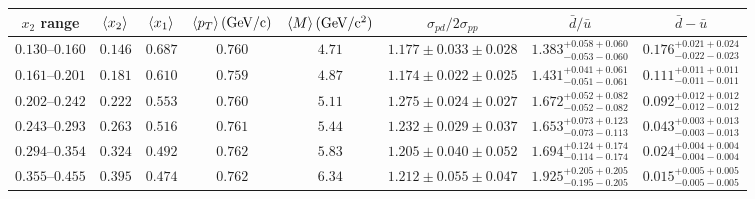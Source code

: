 {
\renewcommand{\arraystretch}{1.5}
\begin{tabular}{cccccccc}
	\hline\hline
	$x_{2}$ range    & $\expval{x_{2}}$ & $\expval{x_{1}}$ & $\expval{p_{T}}(\unit{\GeV/c})$ & $\expval{M}(\unit{\GeV/c^2})$ & $\sigma_{pd}/2\sigma_{pp}$ & $\bar{d}/\bar{u}$                     & $\bar{d}-\bar{u}$                     \\ \hline
	$0.130$--$0.160$ & $0.146$          & $0.687$          & $0.760$                         & $4.71$                        & $1.177\pm0.033\pm0.028$    & $1.383^{+0.058+0.060}_{-0.053-0.060}$ & $0.176^{+0.021+0.024}_{-0.022-0.023}$ \\
	$0.161$--$0.201$ & $0.181$          & $0.610$          & $0.759$                         & $4.87$                        & $1.174\pm0.022\pm0.025$    & $1.431^{+0.041+0.061}_{-0.051-0.061}$ & $0.111^{+0.011+0.011}_{-0.011-0.011}$ \\
	$0.202$--$0.242$ & $0.222$          & $0.553$          & $0.760$                         & $5.11$                        & $1.275\pm0.024\pm0.027$    & $1.672^{+0.052+0.082}_{-0.052-0.082}$ & $0.092^{+0.012+0.012}_{-0.012-0.012}$ \\
	$0.243$--$0.293$ & $0.263$          & $0.516$          & $0.761$                         & $5.44$                        & $1.232\pm0.029\pm0.037$    & $1.653^{+0.073+0.123}_{-0.073-0.113}$ & $0.043^{+0.003+0.013}_{-0.003-0.013}$ \\
	$0.294$--$0.354$ & $0.324$          & $0.492$          & $0.762$                         & $5.83$                        & $1.205\pm0.040\pm0.052$    & $1.694^{+0.124+0.174}_{-0.114-0.174}$ & $0.024^{+0.004+0.004}_{-0.004-0.004}$ \\
	$0.355$--$0.455$ & $0.395$          & $0.474$          & $0.762$                         & $6.34$                        & $1.212\pm0.055\pm0.047$    & $1.925^{+0.205+0.205}_{-0.195-0.205}$ & $0.015^{+0.005+0.005}_{-0.005-0.005}$ \\ \hline\hline
\end{tabular}
}

